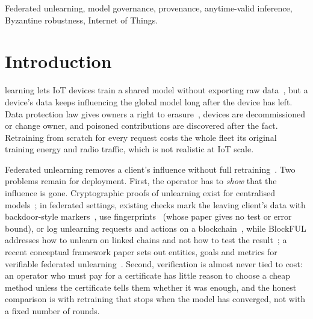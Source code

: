 \documentclass[journal]{IEEEtran}
\begin{document}
\begin{IEEEkeywords}
Federated unlearning, model governance, provenance, anytime-valid inference, Byzantine robustness, Internet of Things.
\end{IEEEkeywords}

\section{Introduction}
 learning lets IoT devices train a shared model without exporting raw data~\cite{mcmahan2017}, but a device's data keeps influencing the global model long after the device has left. Data protection law gives owners a right to erasure~\cite{gdpr}, devices are decommissioned or change owner, and poisoned contributions are discovered after the fact. Retraining from scratch for every request costs the whole fleet its original training energy and radio traffic, which is not realistic at IoT scale.

Federated unlearning removes a client's influence without full retraining~\cite{liu2021federaser,halimi2022,wu2022kd,liu2024survey,romandini2024}. Two problems remain for deployment. First, the operator has to \emph{show} that the influence is gone. Cryptographic proofs of unlearning exist for centralised models~\cite{eisenhofer2025}; in federated settings, existing checks mark the leaving client's data with backdoor-style markers~\cite{gao2024verifi}, use fingerprints~\cite{goswami2026} (whose paper gives no test or error bound), or log unlearning requests and actions on a blockchain~\cite{zuo2024}, while BlockFUL addresses how to unlearn on linked chains and not how to test the result~\cite{blockful2024}; a recent conceptual framework paper sets out entities, goals and metrics for verifiable federated unlearning~\cite{nguyen2026}. Second, verification is almost never tied to cost: an operator who must pay for a certificate has little reason to choose a cheap method unless the certificate tells them whether it was enough, and the honest comparison is with retraining that stops when the model has converged, not with a fixed number of rounds.
\end{document}
